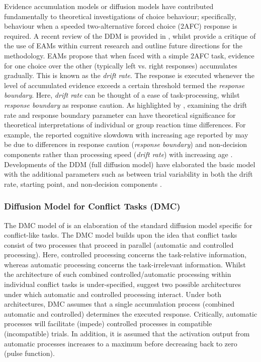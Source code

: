 Evidence accumulation models or diffusion models have contributed fundamentally
to theoretical investigations of choice behaviour; specifically, behaviour when
a speeded two-alternative forced choice (2AFC) response is required. A recent
review of the DDM is provided in \textcite{ratcliff2016diffusion}, whilst
\textcite{evanswagenmakers2019} provide a critique of the use of EAMs within
current research and outline future directions for the methodology. EAMs
propose that when faced with a simple 2AFC task, evidence for one choice over
the other (typically left vs. right responses) accumulates gradually. This is
known as the \textit{drift rate}. The response is executed whenever the level
of accumulated evidence exceeds a certain threshold termed the \textit{response
boundary}. Here, \textit{drift rate} can be thought of a ease of
task-processing, whilst \textit{response boundary} as response caution. As
highlighted by \textcite{evanswagenmakers2019}, examining the drift rate and
response boundary parameter can have theoretical significance for theoretical
interpretations of individual or group reaction time differences. For example,
the reported cognitive slowdown with increasing age reported by
\textcite{salthouse1996processing} may be due to differences in response
caution (\textit{response boundary}) and non-decision components rather than
processing speed (\textit{drift rate}) with increasing age
\parencite{ratcliff2001effects}. Developments of the DDM (full diffusion model)
have elaborated the basic model with the additional parameters such as between
trial variability in both the drift rate, starting point, and non-decision
components \parencite[see ][]{ratcliff2016diffusion}. 


\subsubsection{Diffusion Model for Conflict Tasks (DMC)}
\label{model_details} 

The DMC model of \textcite{ulrich2015automatic} is an elaboration of the
standard diffusion model specific for conflict-like tasks.  The DMC model
builds upon the idea that conflict tasks consist of two processes that proceed
in parallel (automatic and controlled processing). Here, controlled processing
concerns the task-relative information, whereas automatic processing concerns
the task-irrelevant information. Whilst the architecture of such combined
controlled/automatic processing within individual conflict tasks is
under-specified, \textcite{ulrich2015automatic} suggest two possible
architectures \parencite[see Figure 1 in ][]{ulrich2015automatic} under which
automatic and controlled processing interact. Under both architectures, DMC
assumes that a single accumulation process (combined automatic and controlled)
determines the executed response. Critically, automatic processes will
facilitate (impede) controlled processes in compatible (incompatible) trials.
In addition, it is assumed that the activation output from automatic processes
increases to a maximum before decreasing back to zero (pulse function).

